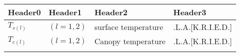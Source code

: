 \begin{longtable}[]{@{}llll@{}}
\toprule
\begin{minipage}[b]{0.22\columnwidth}\raggedright
Header0\strut
\end{minipage} & \begin{minipage}[b]{0.22\columnwidth}\raggedright
Header1\strut
\end{minipage} & \begin{minipage}[b]{0.22\columnwidth}\raggedright
Header2\strut
\end{minipage} & \begin{minipage}[b]{0.22\columnwidth}\raggedright
Header3\strut
\end{minipage}\tabularnewline
\midrule
\endhead
\begin{minipage}[t]{0.22\columnwidth}\raggedright
\(T_{s(l)}\)\strut
\end{minipage} & \begin{minipage}[t]{0.22\columnwidth}\raggedright
\((l=1,2)\)\strut
\end{minipage} & \begin{minipage}[t]{0.22\columnwidth}\raggedright
surface temperature\strut
\end{minipage} & \begin{minipage}[t]{0.22\columnwidth}\raggedright
\K.L.A.{[}K.R.I.E.D.{]}\strut
\end{minipage}\tabularnewline
\begin{minipage}[t]{0.22\columnwidth}\raggedright
\(T_{c(l)}\)\strut
\end{minipage} & \begin{minipage}[t]{0.22\columnwidth}\raggedright
\((l=1,2)\)\strut
\end{minipage} & \begin{minipage}[t]{0.22\columnwidth}\raggedright
Canopy temperature\strut
\end{minipage} & \begin{minipage}[t]{0.22\columnwidth}\raggedright
\K.L.A.{[}K.R.I.E.D.{]}\strut
\end{minipage}\tabularnewline
\begin{minipage}[t]{0.22\columnwidth}\raggedright
\strut
\end{minipage} & \begin{minipage}[t]{0.22\columnwidth}\raggedright
\strut
\end{minipage} & \begin{minipage}[t]{0.22\columnwidth}\raggedright
\strut
\end{minipage} & \begin{minipage}[t]{0.22\columnwidth}\raggedright

\end{minipage}
\end{longtable}
